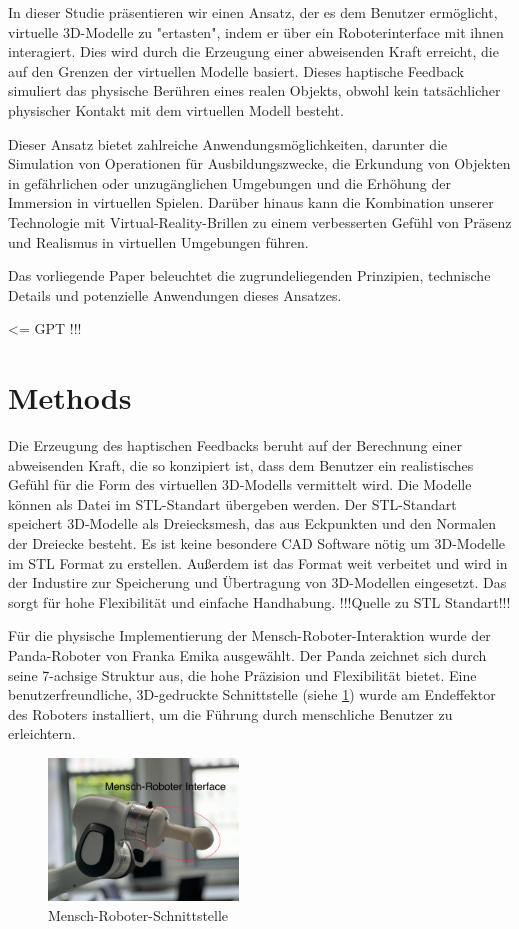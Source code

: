 \documentclass[conference]{IEEEtran}
\begin{document}
In dieser Studie präsentieren wir einen Ansatz, der es dem Benutzer ermöglicht, virtuelle 3D-Modelle zu "ertasten", indem er über ein Roboterinterface mit ihnen interagiert. Dies wird durch die Erzeugung einer abweisenden Kraft erreicht, die auf den Grenzen der virtuellen Modelle basiert. Dieses haptische Feedback simuliert das physische Berühren eines realen Objekts, obwohl kein tatsächlicher physischer Kontakt mit dem virtuellen Modell besteht. 

Dieser Ansatz bietet zahlreiche Anwendungsmöglichkeiten, darunter die Simulation von Operationen für Ausbildungszwecke, die Erkundung von Objekten in gefährlichen oder unzugänglichen Umgebungen und die Erhöhung der Immersion in virtuellen Spielen. Darüber hinaus kann die Kombination unserer Technologie mit Virtual-Reality-Brillen zu einem verbesserten Gefühl von Präsenz und Realismus in virtuellen Umgebungen führen.

Das vorliegende Paper beleuchtet die zugrundeliegenden Prinzipien, technische Details und potenzielle Anwendungen dieses Ansatzes.

<= GPT !!!

\section{Methods}
Die Erzeugung des haptischen Feedbacks beruht auf der Berechnung einer abweisenden Kraft, die so konzipiert ist, dass dem Benutzer ein realistisches Gefühl für die Form des virtuellen 3D-Modells vermittelt wird. Die Modelle können als Datei im STL-Standart übergeben werden. Der STL-Standart speichert 3D-Modelle als Dreiecksmesh, das aus Eckpunkten und den Normalen der Dreiecke besteht. Es ist keine besondere CAD Software nötig um 3D-Modelle im STL Format zu erstellen. Außerdem ist das Format weit verbeitet und wird in der Industire zur Speicherung und Übertragung von 3D-Modellen eingesetzt. Das sorgt für hohe Flexibilität 
und einfache Handhabung. !!!Quelle zu STL Standart!!!

Für die physische Implementierung der Mensch-Roboter-Interaktion wurde der Panda-Roboter von Franka Emika ausgewählt. Der Panda zeichnet sich durch seine 7-achsige Struktur aus, die hohe Präzision und Flexibilität bietet. Eine benutzerfreundliche, 3D-gedruckte Schnittstelle (siehe \ref{fig:MRinterface}) wurde am Endeffektor des Roboters installiert, um die Führung durch menschliche Benutzer zu erleichtern.  

\begin{figure}
    \centering
    \includegraphics[width=0.45\textwidth]{pics/interface.jpeg}
    \caption{Mensch-Roboter-Schnittstelle}
    \label{fig:MRinterface}
\end{figure}
\end{document}
